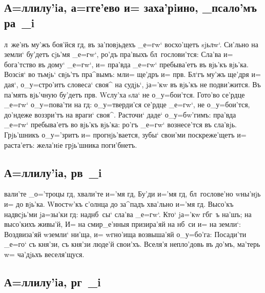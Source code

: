 \documentclass[12pt,a6paper,twoside,dvips,civil=antiqua,cs=pochaev]{hipbook}
\begin{document}
\delimpict

\subsection{А=ллилу'iа, а=гге'ево и= заха'рiино, _псало'мъ ра~_i}

л~же'нъ му'жъ боя'йся гд, въ за'\-по\-вjь\-дехъ _е=гw` восхо'щетъ
sjьлw`. Си'льно на земли` бу'детъ сjь'мя _е=гw`, ро'дъ пра'выхъ
бл~го\-сло\-ви'т\-ся: Сла'ва и= бога'тство въ дому` _е=гw`, и= пра'вда _е=гw`
пребыва'етъ въ вjь'къ вjь'ка. Возсiя` во тьмjь` свjь'тъ пра^вымъ: мл и=
ще'дръ и= прв. Бл`гъ му'жъ ще'дря и= дая`, о_у=стро'итъ словеса` своя^ на
судjь`, jа='кw въ вjь'къ не подви'жится. Въ па'мять вjь'чную бу'детъ
прв. W\т слу'ха sла` не о_у=бои'тся. Гото'во се'рдце _е=гw` о_у=пова'ти
на гд: о_у=тверди'ся се'рдце _е=гw`, не о_у=бои'тся, до'ндеже воззри'тъ на
враги` своя^. Расточи` даде` о_у=бw'гимъ: пра'вда _е=гw` пребыва'етъ во вjь'къ
вjь'ка: ро'гъ _е=гw` вознесе'тся въ сла'вjь. Грjь'шникъ о_у='зритъ и=
прогнjь'вается, зубы` свои'ми поскреже'щетъ и= раста'етъ: жела'нiе грjь'шника
поги'бнетъ.

\slava

\delimpict

\subsection{А=ллилу'iа, рв~_i}

вали'те _о='троцы гд, хвали'те и='мя гд, Бу'ди и='мя гд,
бл~гослове'но w\т ны'нjь и= до вjь'ка. W\т востw'къ с'олнца до за^падъ
хва'льно и='мя гд. Высо'къ над\ъ всjь'ми jа=зы'ки гд: над\ъ нб~сы`
сла'ва _е=гw`. Кто` jа='кw г бг~ъ на'шъ; на высо'кихъ живы'й, И= на
смир_е'нныя призира'яй на нб~си и= на земли`: Воздвиза'яй w\т земли` ни'ща, и=
w\т гно'ища возвыша'яй о_у=бо'га: Посади'ти _е=го` съ кня'зи, съ кня'зи люде'й
свои'хъ. Вселя'я непло'довь въ до'мъ, ма'терь w= ча'дjьхъ веселя'щуся.

\delimpict

\subsection{А=ллилу'iа, рг~_i}
\end{document}
